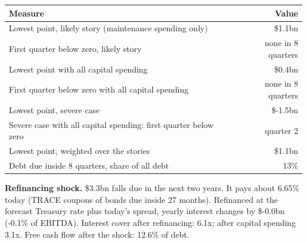 \documentclass[11pt,a4paper]{article}
\begin{document}
\begin{center}\footnotesize\setlength{\tabcolsep}{3.5pt}\begin{tabular}{@{}lr@{}}\toprule
Measure & Value \\\midrule
Lowest point, likely story (maintenance spending only) & \$1.1bn \\
First quarter below zero, likely story & none in 8 quarters \\
Lowest point with all capital spending & \$0.4bn \\
First quarter below zero with all capital spending & none in 8 quarters \\
Lowest point, severe case & \$-1.5bn \\
Severe case with all capital spending: first quarter below zero & quarter 2 \\
Lowest point, weighted over the stories & \$1.1bn \\
Debt due inside 8 quarters, share of all debt & 13\% \\
\bottomrule\end{tabular}\end{center}
\textbf{Refinancing shock.} \$3.3bn falls due in the next two years. It pays about 6.65\% today (TRACE coupons of bonds due inside 27 months). Refinanced at the forecast Treasury rate plus today's spread, yearly interest changes by \$-0.0bn (-0.1\% of EBITDA). Interest cover after refinancing: 6.1x; after capital spending 3.1x. Free cash flow after the shock: 12.6\% of debt.
\end{document}
